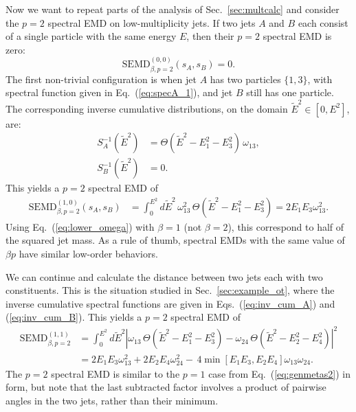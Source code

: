 \documentclass[letterpaper,11pt]{article}
\DeclareRobustCommand{\Sec}[1]{Sec.~\ref{#1}}
\DeclareRobustCommand{\Eq}[1]{Eq.~(\ref{#1})}
\DeclareRobustCommand{\Eqs}[2]{Eqs.~(\ref{#1}) and (\ref{#2})}
\begin{document}
Now we want to repeat parts of the analysis of \Sec{sec:multcalc} and consider the $p = 2$ spectral EMD on low-multiplicity jets.
%
If two jets $A$ and $B$ each consist of a single particle with the same energy $E$, then their $p = 2$ spectral EMD is zero:
%
\begin{equation}
\text{SEMD}^{(0,0)}_{\beta,p=2}(s_A, s_B) = 0.
\end{equation}
%
The first non-trivial configuration is when jet $A$ has two particles $\{1,3\}$, with spectral function given in \Eq{eq:specA_1}, and jet $B$ still has one particle.
%
The corresponding inverse cumulative distributions, on the domain $\tilde{E}^2\in[0,E^2]$, are:
%
\begin{align}
S_A^{-1}(\tilde{E}^2)&=\Theta(\tilde{E}^2-E_1^2-E_3^2) \, \omega_{13},\\
S_B^{-1}(\tilde{E}^2)&= 0.
\end{align}
%
This yields a $p = 2$ spectral EMD of
%
\begin{align}
\text{SEMD}^{(1,0)}_{\beta,p=2}(s_A, s_B) &= \int_0^{E^2} d\tilde{E}^2\, \omega_{13}^2\,\Theta(\tilde{E}^2-E_1^2-E_3^2) = 2E_1E_3 \omega_{13}^2.
\end{align}
%
Using \Eq{eq:lower_omega} with $\beta = 1$ (not $\beta = 2$), this correspond to half of the squared jet mass.
%
As a rule of thumb, spectral EMDs with the same value of $\beta p$ have similar low-order behaviors.



We can continue and calculate the distance between two jets each with two constituents.
%
This is the situation studied in \Sec{sec:example_ot}, where the inverse cumulative spectral functions are given in \Eqs{eq:inv_cum_A}{eq:inv_cum_B}.
%
This yields a $p = 2$ spectral EMD of
\begin{align}
\text{SEMD}^{(1,1)}_{\beta,p=2}&=
\int_0^{E^2} d\tilde{E}^2 \left|\omega_{13}\,\Theta(\tilde{E}^2-E_1^2-E_3^2)-\omega_{24}\,\Theta(\tilde{E}^2-E_2^2-E_4^2)\right|^2\\
&=
2E_1E_3\omega_{13}^2+2E_2E_4\omega_{24}^2-\,4\min[E_1E_3,E_2E_4]\omega_{13}\omega_{24}.\nonumber
\end{align}
%
The $p=2$ spectral EMD is similar to the $p = 1$ case from \Eq{eq:genmetas2} in form, but note that the last subtracted factor involves a product of pairwise angles in the two jets, rather than their minimum.


\end{document}
